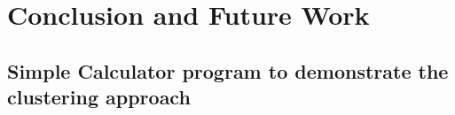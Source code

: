 \documentclass{uofsthesis-cs}
\begin{document}
\chapter{Conclusion and Future Work}









%

\uofsappendix

\begin{appendices}

\chapter{Simple Calculator program to demonstrate the clustering approach}
\label{appendix:calculator}



\end{appendices}
\end{document}
